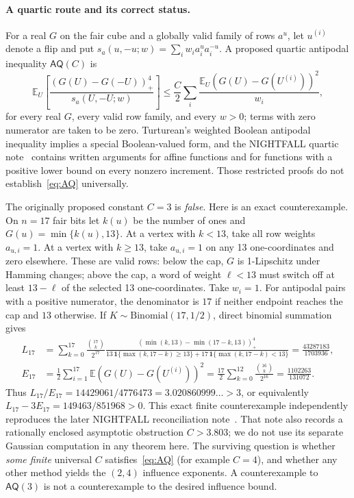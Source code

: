 \documentclass[11pt]{article}
\numberwithin{equation}{section}
\theoremstyle{remark}
\newcommand{\E}{\mathbb E}
\newcommand{\one}{\mathbf 1}
\newcommand{\pos}[1]{(#1)_{+}}
\begin{document}
\paragraph{A quartic route and its correct status.}
For a real $G$ on the fair cube and a globally valid family of rows $a^u$, let $u^{(i)}$ denote a flip and put
$s_a(u,-u;w)=\sum_iw_i a_i^ua_i^{-u}$. A proposed quartic antipodal inequality $\mathsf{AQ}(C)$ is
\begin{equation}\label{eq:AQ}
 \E_U\left[\frac{\pos{G(U)-G(-U)}^4}{s_a(U,-U;w)}\right]
 \le\frac C2\sum_i\frac{\E_U(G(U)-G(U^{(i)}))^2}{w_i},
\end{equation}
for every real $G$, every valid row family, and every $w>0$; terms with zero numerator are taken to be zero. Turturean's weighted Boolean antipodal inequality implies a special Boolean-valued form, and the NIGHTFALL quartic note~\cite{WriQuartic} contains written arguments for affine functions and for functions with a positive lower bound on every nonzero increment. Those restricted proofs do not establish~\eqref{eq:AQ} universally.

The originally proposed constant $C=3$ is \emph{false}. Here is an exact counterexample. On $n=17$ fair bits let $k(u)$ be the number of ones and $G(u)=\min\{k(u),13\}$. At a vertex with $k<13$, take all row weights $a_{u,i}=1$. At a vertex with $k\ge13$, take $a_{u,i}=1$ on any 13 one-coordinates and zero elsewhere. These are valid rows: below the cap, $G$ is 1-Lipschitz under Hamming changes; above the cap, a word of weight $\ell<13$ must switch off at least $13-\ell$ of the selected 13 one-coordinates. Take $w_i=1$. For antipodal pairs with a positive numerator, the denominator is $17$ if neither endpoint reaches the cap and $13$ otherwise. If $K\sim\mathrm{Binomial}(17,1/2)$, direct binomial summation gives
\begin{equation}\label{eq:AQnumbers}
 \begin{split}
 L_{17}&=\sum_{k=0}^{17}\frac{\binom{17}{k}}{2^{17}}
 \frac{\pos{\min(k,13)-\min(17-k,13)}^4}
 {13\,\one\{\max(k,17-k)\ge13\}+17\,\one\{\max(k,17-k)<13\}}
 =\frac{43287183}{1703936},\\
 E_{17}&=\frac12\sum_{i=1}^{17}\E(G(U)-G(U^{(i)}))^2
 =\frac{17}{2}\sum_{k=0}^{12}\frac{\binom{16}{k}}{2^{16}}
 =\frac{1102263}{131072}.
 \end{split}
\end{equation}
Thus $L_{17}/E_{17}=14429061/4776473=3.020860999\ldots>3$, or equivalently $L_{17}-3E_{17}=149463/851968>0$. This exact finite counterexample independently reproduces the later NIGHTFALL reconciliation note~\cite{NFReconcile}. That note also records a rationally enclosed asymptotic obstruction $C>3.803$; we do not use its separate Gaussian computation in any theorem here. The surviving question is whether \emph{some finite} universal $C$ satisfies~\eqref{eq:AQ} (for example $C=4$), and whether any other method yields the $(2,4)$ influence exponents. A counterexample to $\mathsf{AQ}(3)$ is not a counterexample to the desired influence bound.
\end{document}
